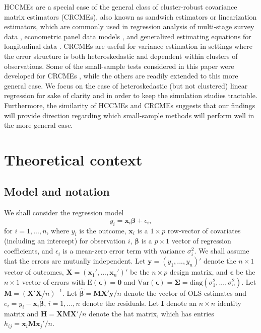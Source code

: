 \documentclass[12pt]{article}\usepackage[]{graphicx}\usepackage[]{color}
\newcommand{\E}{\text{E}}
\newcommand{\Var}{\text{Var}}
\newcommand{\diag}{\text{diag}}
\newcommand{\bm}{\mathbf}
\newcommand{\bs}{\boldsymbol}
\begin{document}
HCCMEs are a special case of the general class of cluster-robust covariance matrix estimators (CRCMEs), also known as sandwich estimators or linearization estimators, which are commonly used in regression analysis of multi-stage survey data \citep{Fuller1975regression, Skinner1989domain}, econometric panel data models \citep{white1984asymptotic, Arellano1987computing}, and generalized estimating equations for longitudinal data \citep{Liang1986longitudinal}. 
CRCMEs are useful for variance estimation in settings where the error structure is both heteroskedastic and dependent within clusters of observations.
Some of the small-sample tests considered in this paper were developed for CRCMEs \citep[i.e.,][]{Bell2002bias, McCaffrey2006improved}, while the others are readily extended to this more general case.
We focus on the case of heteroskedastic (but not clustered) linear regression for sake of clarity and in order to keep the simulation studies tractable. 
Furthermore, the similarity of HCCMEs and CRCMEs suggests that our findings will provide direction regarding which small-sample methods will perform well in the more general case.



\section{Theoretical context}
\label{sec:context}

\subsection{Model and notation}
\label{subsec:model}

We shall consider the regression model
\begin{equation}
\label{eq:regression_model}
y_i = \bm{x}_i\bs\beta + \epsilon_i,
\end{equation}
for $i = 1,...,n$, where $y_i$ is the outcome, $\bm{x}_i$ is a $1 \times p$ row-vector of covariates (including an intercept) for observation $i$, $\bs\beta$ is a $p \times 1$ vector of regression coefficients, and $\epsilon_i$ is a mean-zero error term with variance $\sigma_i^2$. 
We shall assume that the errors are mutually independent. 
Let $\bm{y} = \left(y_1,...,y_n\right)'$ denote the $n \times 1$ vector of outcomes, $\bm{X} = \left(\bm{x}_1',...,\bm{x}_n'\right)'$ be the $n \times p$ design matrix, and $\bs\epsilon$ be the $n \times 1$ vector of errors with $\E\left(\bs\epsilon\right) = \bm{0}$ and $\Var\left(\bs\epsilon\right) = \bs\Sigma = \diag\left(\sigma_1^2,...,\sigma_n^2\right)$. 
Let $\bm{M} = \left(\bm{X}'\bm{X} / n\right)^{-1}$. 
Let $\bs{\hat\beta} = \bm{M}\bm{X}'\bm{y} / n$ denote the vector of OLS estimates and $e_i = y_i - \bm{x}_i \bs{\hat\beta}$, $i = 1,...,n$ denote the residuals. 
Let $\bm{I}$ denote an $n \times n$ identity matrix and $\bm{H} = \bm{X}\bm{M}\bm{X}' / n$ denote the hat matrix, which has entries $h_{ij} = \bm{x}_i \bm{M}\bm{x}_j' / n$.
\end{document}
